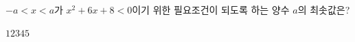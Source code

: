 $-a<x<a$가 $x^2+6x+8<0$이기 위한 필요조건이 되도록 하는 양수 $a$의 최솟값은?
\begin{choices32}{$1$}{$2$}{$3$}{$4$}{$5$}\end{choices32}
